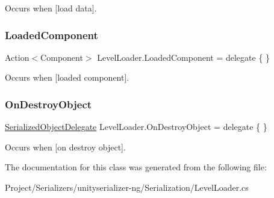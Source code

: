 Occurs when \mbox{[}load data\mbox{]}. 

\mbox{\label{class_level_loader_a7db5619e1031ce444bcd94441ee4d1ac}} 
\subsubsection{\texorpdfstring{Loaded\+Component}{LoadedComponent}}
{\footnotesize\ttfamily Action$<$Component$>$ Level\+Loader.\+Loaded\+Component = delegate \{ \}\hspace{0.3cm}{\ttfamily [static]}}



Occurs when \mbox{[}loaded component\mbox{]}. 

\mbox{\label{class_level_loader_a5cdf0c07cc677bd052a4e4b11799eccc}} 
\subsubsection{\texorpdfstring{On\+Destroy\+Object}{OnDestroyObject}}
{\footnotesize\ttfamily \hyperlink{class_level_loader_a4483f031503dac772decbd9beedd784a}{Serialized\+Object\+Delegate} Level\+Loader.\+On\+Destroy\+Object = delegate \{ \}\hspace{0.3cm}{\ttfamily [static]}}



Occurs when \mbox{[}on destroy object\mbox{]}. 



The documentation for this class was generated from the following file\+:\begin{DoxyCompactItemize}
\item 
Project/\+Serializers/unityserializer-\/ng/\+Serialization/Level\+Loader.\+cs\end{DoxyCompactItemize}
